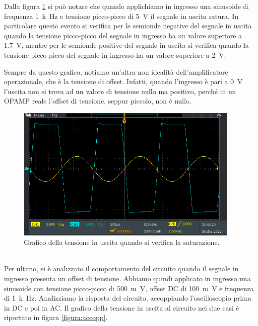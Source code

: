 \documentclass{report}
\begin{document}
Dalla figura \ref{figura:satur} si può notare che quando applichiamo in ingresso una sinusoide di frequenza \SI{1}{k\hertz} e tensione picco-picco di \SI{5}{\volt} il segnale in uscita satura. In particolare questo evento si verifica per le semionde negative del segnale in uscita quando la tensione picco-picco del segnale in ingresso ha un valore superiore a \SI{1.7}{\volt}, mentre per le semionde positive del segnale in uscita si verifica quando la tensione picco-picco del segnale in ingresso ha un valore superiore a \SI{2}{\volt}. \par
Sempre da questo grafico, notiamo un'altra non idealità dell'amplificatore operazionale, che è la tensione di offset. Infatti, quando l'ingresso è pari a \SI{0}{\volt} l'uscita non si trova ad un valore di tensione nullo ma positivo, perché in un OPAMP reale l'offset di tensione, seppur piccolo, non è nullo. %
\begin{figure}[h!]
	\centering
	\includegraphics[height=6.5cm]{immagini/TEK00015}
	\caption{Grafico della tensione in uscita quando si verifica la saturazione.}
	\label{figura:satur}
\end{figure}
\\Per ultimo, si è analizzato il comportamento del circuito quando il segnale in ingresso presenta un offset di tensione. Abbiamo quindi applicato in ingresso una sinusoide con tensione picco-picco di \SI{500}{m\volt}, offset DC di \SI{+100}{m\volt} e  frequenza di \SI{1}{k\hertz}. Analizziamo la risposta del circuito, accoppiando l'oscilloscopio prima in DC e poi in AC. Il grafico della tensione in uscita al circuito nei due casi è riportato in figura \ref{figura:accopp}. \par
\end{document}
